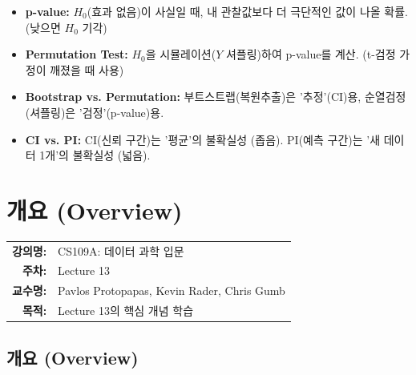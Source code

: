 \documentclass[11pt,a4paper]{book}
\makeatletter
\theoremstyle{definition}
\newcommand{\metainfo}[4]{
\begin{tcolorbox}[
    colback=lightpurple,
    colframe=darkpurple,
    boxrule=1pt,
    arc=2mm,
    left=10pt,
    right=10pt,
    top=8pt,
    bottom=8pt
]
\begin{tabular}{@{}rl@{}}
\textbf{강의명:} & #1 \\[0.3em]
\textbf{주차:} & #2 \\[0.3em]
\textbf{교수명:} & #3 \\[0.3em]
\textbf{목적:} & \begin{minipage}[t]{0.75\textwidth}#4\end{minipage}
\end{tabular}
\end{tcolorbox}
}
\makeatother
\begin{document}
\begin{tcolorbox}[colback=orange!5!white, colframe=orange!75!black, title={가설 검정 복습}]
\begin{itemize}
    \item \textbf{p-value:} $H_0$(효과 없음)이 사실일 때, 내 관찰값보다 더 극단적인 값이 나올 확률. (낮으면 $H_0$ 기각)
    \item \textbf{Permutation Test:} $H_0$을 시뮬레이션($Y$ 셔플링)하여 p-value를 계산. (t-검정 가정이 깨졌을 때 사용)
    \item \textbf{Bootstrap vs. Permutation:} 부트스트랩(복원추출)은 '추정'(CI)용, 순열검정(셔플링)은 '검정'(p-value)용.
    \item \textbf{CI vs. PI:} CI(신뢰 구간)는 '평균'의 불확실성 (좁음). PI(예측 구간)는 '새 데이터 1개'의 불확실성 (넓음).
\end{itemize}
\end{tcolorbox}


\chapter{개요 (Overview)}
\label{ch:lecture13}

\metainfo{CS109A: 데이터 과학 입문}{Lecture 13}{Pavlos Protopapas, Kevin Rader, Chris Gumb}{Lecture 13의 핵심 개념 학습}


\section*{개요 (Overview)}
\end{document}
